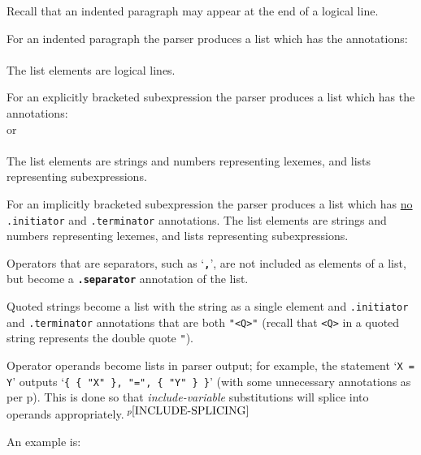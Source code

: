 \documentclass[12pt]{article}
\newcommand{\TT}[1]{{\tt \bfseries #1}}
\newcommand{\ttkey}[1]{{\tt \bfseries #1}}
\newcommand{\pagref}[1]{p\pageref{#1}}
\newcommand{\pagnote}[1]{$\,^{p\pageref{#1}}$}
\begin{document}
Recall that an indented paragraph may appear at the end of a logical line.

For an indented paragraph the parser produces a list
which has the annotations: \\
\hspace*{0.5in}{\tt ".initiator" => ":",
                    ".terminator" => *INDENTED-PARAGRAPH*} \\
The list elements are logical lines.

For an explicitly bracketed subexpression the parser produces a list which has
the annotations:
\hspace*{0.5in}{\tt ".initiator" => "(", ".terminator" => ")"} \\
or \\
\hspace*{0.5in}{\tt ".initiator" => "[", ".terminator" => "]"} \\
The list elements are strings and numbers representing lexemes, and
lists representing subexpressions.

For an implicitly bracketed subexpression the parser produces a list which has
\underline{no} {\tt .initiator} and {\tt .terminator} annotations.
The list elements are strings and numbers representing lexemes, and
lists representing subexpressions.

Operators that are separators, such as `\TT{,}', are not included as elements
of a list, but become a \ttkey{.separator} annotation of the list.

Quoted strings become a list with the string as a single element
and {\tt .initiator} and {\tt .terminator} annotations that are
both {\tt "<Q>"} (recall that {\tt <Q>} in a quoted string represents
the double quote {\tt "}).

Operator operands become lists in parser output;
for example, the statement `{\tt X = Y}' outputs
`{\tt \{ \{ "X" \}, "=", \{ "Y" \} \}}' (with some unnecessary annotations as
per \pagref{UNNECESSARY-ANNOTATIONS}).
This is done so that {\em include-variable} substitutions will splice
into operands appropriately.\pagnote{INCLUDE-SPLICING}

An example is:
\end{document}
